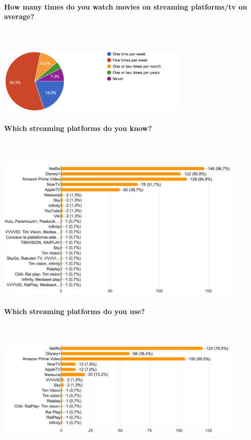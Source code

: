 \documentclass[12pt, a4paper]{article}
\begin{document}
\paragraph{How many times do you watch movies on streaming platforms/tv on average?}\mbox{}\\\\
\includegraphics[width=0.7\textwidth]{Images/timeStreaming.png}\\

\paragraph{Which streaming platforms do you know?}\mbox{}\\\\
\includegraphics[width=0.9\textwidth]{Images/streamingPlatform.png}\\

\paragraph{Which streaming platforms do you use?}\mbox{}\\\\
\includegraphics[width=0.9\textwidth]{Images/streamingPlatformUsed.png}\\
\end{document}
